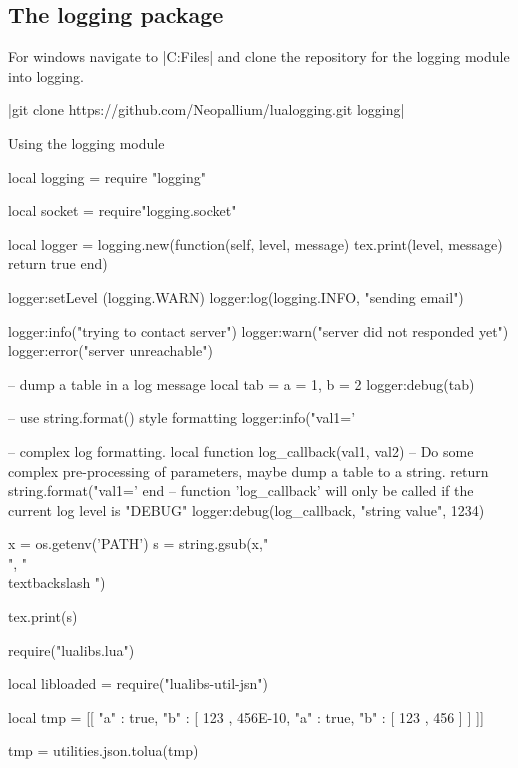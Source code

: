 \subsection{The logging package}

For windows navigate to |C:\Program Files\scripts| and clone the repository for the logging module into logging. 

|git clone https://github.com/Neopallium/lualogging.git  logging|


 
\begin{texexample}{Using the logging module}{}
\begin{luacode}
local logging = require "logging"

local socket = require"logging.socket"

local logger = logging.new(function(self, level, message)
                             tex.print(level, message)
                             return true
                           end)
                           
logger:setLevel (logging.WARN)
logger:log(logging.INFO, "sending email")

logger:info("trying to contact server")
logger:warn("server did not responded yet")
logger:error("server unreachable")

-- dump a table in a log message
local tab = { a = 1, b = 2 }
logger:debug(tab)

-- use string.format() style formatting
logger:info("val1='%

-- complex log formatting.
local function log_callback(val1, val2)
	-- Do some complex pre-processing of parameters, maybe dump a table to a string.
	return string.format("val1='%
end
-- function 'log_callback' will only be called if the current log level is "DEBUG"
logger:debug(log_callback, "string value", 1234)

x = os.getenv('PATH')
s = string.gsub(x,"\\", "\\textbackslash ")

tex.print(s)

require("lualibs.lua")

local libloaded = require("lualibs-util-jsn")

local tmp = [[ { "a" : true, "b" : [ 123 , 456E-10, { "a" : true, "b" : [ 123 , 456 ] } ] } ]]

 tmp = utilities.json.tolua(tmp)
 

\end{luacode}
\end{texexample}
